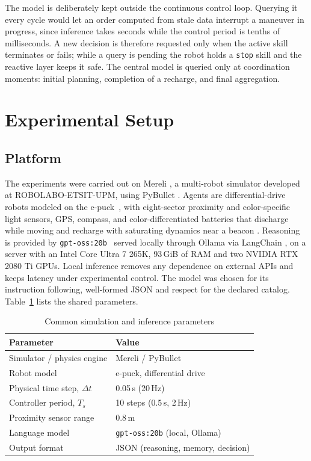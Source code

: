 \documentclass[conference]{IEEEtran}
\begin{document}
The model is deliberately kept outside the continuous control loop.
Querying it every cycle would let an order computed from stale data
interrupt a maneuver in progress, since inference takes seconds while the
control period is tenths of milliseconds. A new decision is therefore
requested only when the active skill terminates or fails; while a query
is pending the robot holds a \texttt{stop} skill and the reactive layer
keeps it safe. The central model is queried only at coordination moments:
initial planning, completion of a recharge, and final aggregation.

\section{Experimental Setup}

\subsection{Platform}

The experiments were carried out on Mereli \cite{mereli}, a multi-robot
simulator developed at ROBOLABO-ETSIT-UPM, using PyBullet
\cite{pybullet}. Agents are differential-drive robots modeled on the
e-puck~\cite{mondada2009}, with eight-sector proximity and color-specific
light sensors, GPS, compass, and color-differentiated batteries that
discharge while moving and recharge with saturating dynamics near a
beacon \cite{sendra2026}. Reasoning is provided by
\texttt{gpt-oss:20b}~\cite{gptoss} served locally through Ollama
\cite{ollama} via LangChain \cite{langchain}, on a server with an Intel
Core Ultra 7 265K, 93\,GiB of RAM and two NVIDIA RTX 2080 Ti GPUs. Local
inference removes any dependence on external APIs and keeps latency under
experimental control. The model was chosen for its instruction following, well-formed JSON and
respect for the declared catalog. Table~\ref{tab:params} lists the shared
parameters.

\begin{table}[t]
\caption{Common simulation and inference parameters}
\label{tab:params}
\centering
\footnotesize
\begin{tabular}{@{}ll@{}}
\toprule
Parameter & Value \\
\midrule
Simulator / physics engine & Mereli / PyBullet \\
Robot model & e-puck, differential drive \\
Physical time step, $\Delta t$ & 0.05\,s (20\,Hz) \\
Controller period, $T_s$ & 10 steps (0.5\,s, 2\,Hz) \\
Proximity sensor range & 0.8\,m \\
Language model & \texttt{gpt-oss:20b} (local, Ollama) \\
Output format & JSON (reasoning, memory, decision) \\
\bottomrule
\end{tabular}
\end{table}
\end{document}
